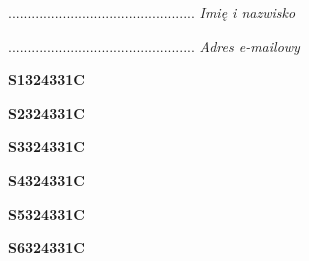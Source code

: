 \begin{turn}{90}\begin{minipage}{\linewidth} \vspace{20mm} ................................................  \textit{Imię i nazwisko}\end{minipage}\end{turn}

\begin{turn}{90}\begin{minipage}{\linewidth} \vspace{20mm} ................................................  \textit{Adres e-mailowy}\end{minipage}\end{turn}

\begin{turn}{90}\huge \begin{minipage}{\linewidth} \vspace{10mm}\textbf{S1324331C}\end{minipage}\end{turn}

\begin{turn}{90}\huge \begin{minipage}{\linewidth} \vspace{10mm}\textbf{S2324331C}\end{minipage}\end{turn}

\begin{turn}{90}\huge \begin{minipage}{\linewidth} \vspace{10mm}\textbf{S3324331C}\end{minipage}\end{turn}

\begin{turn}{90}\huge \begin{minipage}{\linewidth} \vspace{10mm}\textbf{S4324331C}\end{minipage}\end{turn}

\begin{turn}{90}\huge \begin{minipage}{\linewidth} \vspace{10mm}\textbf{S5324331C}\end{minipage}\end{turn}

\begin{turn}{90}\huge \begin{minipage}{\linewidth} \vspace{10mm}\textbf{S6324331C}\end{minipage}\end{turn}

